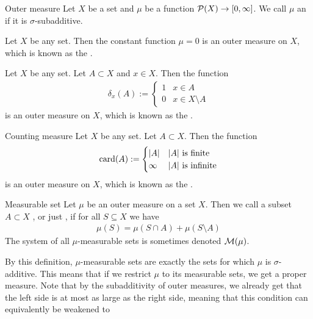 \begin{importantdefinition}{Outer measure}{}
	Let $X$ be a set and $\mu$ be a function $\mathcal{P}(X) \to [0,\infty]$. We call $\mu$ an  if it is $\sigma$-subadditive.
\end{importantdefinition}
\begin{theorem}
	Let $X$ be any set. Then the constant function $\mu = 0$ is an outer measure on $X$, which is known as the .
\end{theorem}
\begin{theorem}
	Let $X$ be any set. Let $A \subset X$ and $x \in X$. Then the function
	\begin{align*}
		\delta_x(A) :=
		\begin{cases}
			1 & x \in A\\
			0 & x \in X \setminus A
		\end{cases}
	\end{align*}
	is an outer measure on $X$, which is known as the .
\end{theorem}
\begin{importanttheorem}{Counting measure}{}
	Let $X$ be any set. Let $A \subset X$. Then the function
	\begin{align*}
		\operatorname{card}(A) := 
		\begin{cases}
			\abs{A} & \abs{A} \textnormal{ is finite}\\
			\infty & \abs{A} \textnormal{ is infinite}
		\end{cases}
	\end{align*}
	is an outer measure on $X$, which is known as the .
\end{importanttheorem}
\begin{importantdefinition}{Measurable set}{}
	Let $\mu$ be an outer measure on a set $X$. Then we call a subset $A \subset X$ , or just , if for all $S \subseteq X$ we have
	\begin{align*}
		\mu(S) = \mu(S \cap A) + \mu(S \setminus A)
	\end{align*}
	The system of all $\mu$-measurable sets is sometimes denoted $\mathcal{M}(\mu)$.
\end{importantdefinition}
By this definition, $\mu$-measurable sets are exactly the sets for which $\mu$ is $\sigma$-additive. This means that if we restrict $\mu$ to its measurable sets, we get a proper measure.
\newpar		
Note that by the subadditivity of outer measures, we already get that the left side is at most as large as the right side, meaning that this condition can equivalently be weakened to
